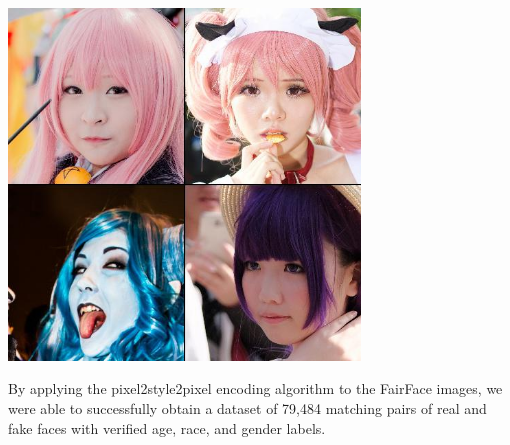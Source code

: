 \documentclass[11pt, letterpaper]{article}
\newenvironment{Figure}
  {\par\medskip\noindent\minipage{\linewidth}}
  {\endminipage\par\medskip}
\begin{document}
\begin{multicols}{2}
  \begin{Figure}
    \centering
    \includegraphics[width=0.7\textwidth]{figures/false-negatives.jpg}
    \label{falseneg}
  \end{Figure}

  By applying the pixel2style2pixel encoding algorithm to the FairFace images,
  we were able to successfully obtain a dataset of 79,484 matching pairs of
  real and fake faces with verified age, race, and gender labels.


\end{multicols}
\end{document}
